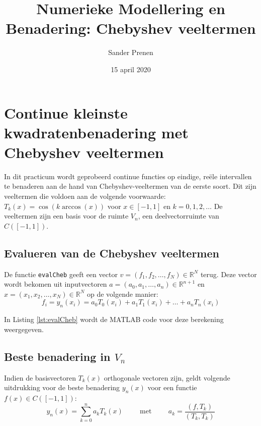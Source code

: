 \documentclass[a4paper, 12pt, titlepage, fleqn]{article}
\begin{document}
\title{\textbf{Numerieke Modellering en Benadering: Chebyshev veeltermen}}
\author{Sander Prenen}

\date{15 april 2020}
\begin{titlepage}
	\maketitle
	\thispagestyle{empty}
\end{titlepage}

\newpage
\section{Continue kleinste kwadratenbenadering met Chebyshev veeltermen}
In dit practicum wordt geprobeerd continue functies op eindige, re\"ele intervallen te benaderen aan de hand van Chebyshev-veeltermen van de eerste soort. Dit zijn veeltermen die voldoen aan de volgende voorwaarde: $T_k(x) = \cos(k \arccos (x))$ voor $x \in [-1,1]$ en $k = 0,1,2,\ldots$ De veeltermen zijn een basis voor de ruimte $V_n$, een deelvectorruimte van $C([-1,1])$. 

\subsection{Evalueren van de Chebyshev veeltermen}
De functie \texttt{evalCheb} geeft een vector $v = (f_1, f_2, \ldots, f_N) \in \mathbb{R}^N$ terug. Deze vector wordt bekomen uit inputvectoren $a = (a_0,a_1,\ldots, a_n) \in \mathbb{R}^{n+1}$ en $x = (x_1,x_2,\ldots,x_N) \in \mathbb{R}^N$ op de volgende manier:
\begin{equation*}
f_i = y_n(x_i) = a_0T_0(x_i) + a_1T_1(x_i) + \ldots + a_nT_n(x_i)
\end{equation*}

In Listing \ref{lst:evalCheb} wordt de MATLAB code voor deze berekening weergegeven.



\subsection{Beste benadering in $V_n$}
Indien de basisvectoren $T_k(x)$ orthogonale vectoren zijn, geldt volgende uitdrukking voor de beste benadering $y_n(x)$ voor een functie $f(x) \in C([-1,1])$:
\begin{equation}
y_n(x) = \sum_{k=0}^na_kT_k(x) \hspace{1cm} \text{met} \hspace{1cm} a_k = \frac{(f,T_k)}{(T_k,T_k)}
\label{eq:beste_benadering}
\end{equation}
\end{document}
